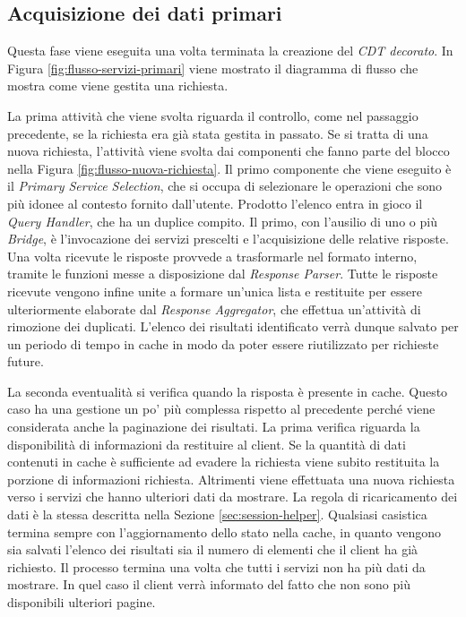 \subsection*{Acquisizione dei dati primari}

Questa fase viene eseguita una volta terminata la creazione del \emph{CDT decorato}. In Figura \ref{fig:flusso-servizi-primari} viene mostrato il diagramma di flusso che mostra come viene gestita una richiesta.

La prima attività che viene svolta riguarda il controllo, come nel passaggio precedente, se la richiesta era già stata gestita in passato. Se si tratta di una nuova richiesta, l'attività viene svolta dai componenti che fanno parte del blocco  nella Figura \ref{fig:flusso-nuova-richiesta}. Il primo componente che viene eseguito è il \emph{Primary Service Selection}, che si occupa di selezionare le operazioni che sono più idonee al contesto fornito dall'utente. Prodotto l'elenco entra in gioco il \emph{Query Handler}, che ha un duplice compito. Il primo, con l'ausilio di uno o più \emph{Bridge}, è l'invocazione dei servizi prescelti e l'acquisizione delle relative risposte. Una volta ricevute le risposte provvede a trasformarle nel formato interno, tramite le funzioni messe a disposizione dal \emph{Response Parser}. Tutte le risposte ricevute vengono infine unite a formare un'unica lista e restituite per essere ulteriormente elaborate dal \emph{Response Aggregator}, che effettua un'attività di rimozione dei duplicati. L'elenco dei risultati identificato verrà dunque salvato per un periodo di tempo in cache in modo da poter essere riutilizzato per richieste future.

La seconda eventualità si verifica quando la risposta è presente in cache. Questo caso ha una gestione un po' più complessa rispetto al precedente perché viene considerata anche la paginazione dei risultati. La prima verifica riguarda la disponibilità di informazioni da restituire al client. Se la quantità di dati contenuti in cache è sufficiente ad evadere la richiesta viene subito restituita la porzione di informazioni richiesta. Altrimenti viene effettuata una nuova richiesta verso i servizi che hanno ulteriori dati da mostrare. La regola di ricaricamento dei dati è la stessa descritta nella Sezione \ref{sec:session-helper}. Qualsiasi casistica termina sempre con l'aggiornamento dello stato nella cache, in quanto vengono sia salvati l'elenco dei risultati sia il numero di elementi che il client ha già richiesto. Il processo termina una volta che tutti i servizi non ha più dati da mostrare. In quel caso il client verrà informato del fatto che non sono più disponibili ulteriori pagine.

